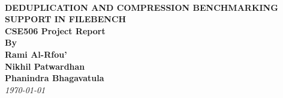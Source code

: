 \begin{titlepage}
 
\begin{center}

\ \\[1.5cm] 
\textbf{\Large DEDUPLICATION AND COMPRESSION BENCHMARKING SUPPORT IN FILEBENCH}\\[1.5cm]
 
 \textbf{ \small CSE506 Project Report}\\[1.5cm]

\textbf{By\\Rami Al-Rfou'\\ Nikhil Patwardhan \\ Phanindra Bhagavatula}\\[1.5cm]
{\textit{ \today}} 


\end{center}
\vfill
\end{titlepage}
